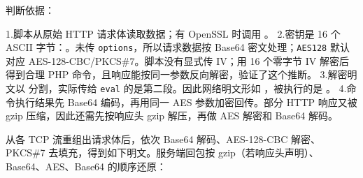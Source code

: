 判断依据：

1.脚本从原始 HTTP 请求体读取数据；有 OpenSSL 时调用 \texttt{}。 2.密钥是 16 个 ASCII 字节：\texttt{}。未传 \texttt{options}，所以请求数据按 Base64 密文处理；\texttt{AES128} 默认对应 AES-128-CBC/PKCS\#7。脚本没有显式传 IV；用 16 个零字节 IV 解密后得到合理 PHP 命令，且响应能按同一参数反向解密，验证了这个推断。 3.解密明文以 \texttt{\textbar{}} 分割，实际传给 \texttt{eval} 的是第二段。因此网络明文形如 \texttt{}，被执行的是 \texttt{}。 4.命令执行结果先 Base64 编码，再用同一 AES 参数加密回传。部分 HTTP 响应又被 gzip 压缩，因此还需先按响应头 gzip 解压，再做 AES 解密和 Base64 解码。

从各 TCP 流重组出请求体后，依次 Base64 解码、AES-128-CBC 解密、PKCS\#7 去填充，得到如下明文。服务端回包按 gzip（若响应头声明）、Base64、AES、Base64 的顺序还原：

